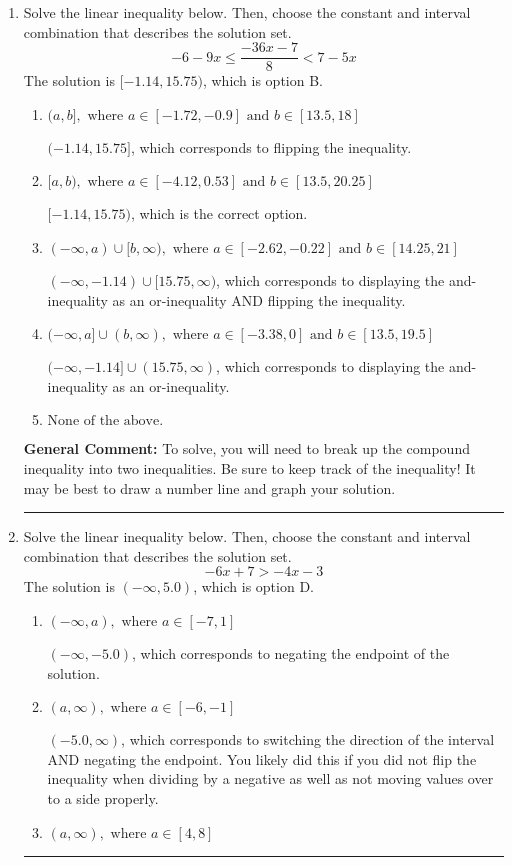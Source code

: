 \documentclass{extbook}[14pt]
\newcommand{\litem}[1]{\item #1

\rule{\textwidth}{0.4pt}}
\begin{document}
\begin{enumerate}
{\textbf{General Comment:} When thinking about this language, it helps to draw a number line and try points.
}
\litem{
Solve the linear inequality below. Then, choose the constant and interval combination that describes the solution set.
\[ -6 - 9 x \leq \frac{-36 x - 7}{8} < 7 - 5 x \]The solution is \( [-1.14, 15.75) \), which is option B.\begin{enumerate}[label=\Alph*.]
\item \( (a, b], \text{ where } a \in [-1.72, -0.9] \text{ and } b \in [13.5, 18] \)

$(-1.14, 15.75]$, which corresponds to flipping the inequality.
\item \( [a, b), \text{ where } a \in [-4.12, 0.53] \text{ and } b \in [13.5, 20.25] \)

$[-1.14, 15.75)$, which is the correct option.
\item \( (-\infty, a) \cup [b, \infty), \text{ where } a \in [-2.62, -0.22] \text{ and } b \in [14.25, 21] \)

$(-\infty, -1.14) \cup [15.75, \infty)$, which corresponds to displaying the and-inequality as an or-inequality AND flipping the inequality.
\item \( (-\infty, a] \cup (b, \infty), \text{ where } a \in [-3.38, 0] \text{ and } b \in [13.5, 19.5] \)

$(-\infty, -1.14] \cup (15.75, \infty)$, which corresponds to displaying the and-inequality as an or-inequality.
\item \( \text{None of the above.} \)


\end{enumerate}

\textbf{General Comment:} To solve, you will need to break up the compound inequality into two inequalities. Be sure to keep track of the inequality! It may be best to draw a number line and graph your solution.
}
\litem{
Solve the linear inequality below. Then, choose the constant and interval combination that describes the solution set.
\[ -6x + 7 > -4x -3 \]The solution is \( (-\infty, 5.0) \), which is option D.\begin{enumerate}[label=\Alph*.]
\item \( (-\infty, a), \text{ where } a \in [-7, 1] \)

 $(-\infty, -5.0)$, which corresponds to negating the endpoint of the solution.
\item \( (a, \infty), \text{ where } a \in [-6, -1] \)

 $(-5.0, \infty)$, which corresponds to switching the direction of the interval AND negating the endpoint. You likely did this if you did not flip the inequality when dividing by a negative as well as not moving values over to a side properly.
\item \( (a, \infty), \text{ where } a \in [4, 8] \)


\end{enumerate}}
\end{enumerate}
\end{document}
